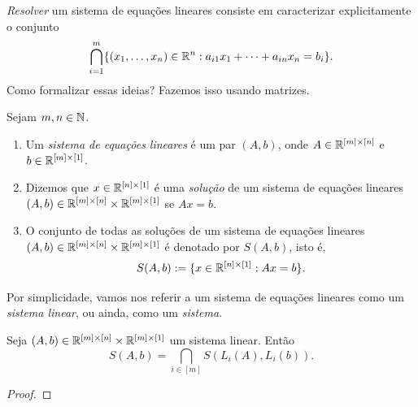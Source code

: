 \emph{Resolver} um sistema de equações lineares consiste em caracterizar explicitamente o conjunto
    \[
        \bigcap_{i=1}^{m} \{ (x_1, \ldots, x_n) \in \mathbb{R}^n : a_{i1} x_1 + \cdots + a_{in} x_n = b_i \}.
    \]
Como formalizar essas ideias? Fazemos isso usando matrizes.

\begin{definition}
    Sejam $m,n \in \mathbb{N}$.
        \begin{enumerate}[leftmargin=*, align=left, label=\textbf{(\alph*)}]
            \item Um \emph{sistema de equações lineares} é um par $(A,b)$, onde $A \in \mathbb{R}^{[m] \times [n]}$ e $b \in \mathbb{R}^{[m] \times [1]}$.
            \item Dizemos que $x \in \mathbb{R}^{[n] \times [1]}$ é uma \emph{solução} de um sistema de equações lineares $(A,b) \in \mathbb{R}^{[m] \times [n]} \times \mathbb{R}^{[m] \times [1]}$ se $Ax=b$.
            \item O conjunto de todas as soluções de um sistema de equações lineares $(A,b) \in \mathbb{R}^{[m] \times [n]} \times \mathbb{R}^{[m] \times [1]}$ é denotado por $S(A,b)$, isto é,
                \[
                    S(A,b) := \{x \in \mathbb{R}^{[n] \times [1]} : Ax=b\}.
                \]
        \end{enumerate}
\end{definition}

Por simplicidade, vamos nos referir a um sistema de equações lineares como um \emph{sistema linear}, ou ainda, como um \emph{sistema}.

\begin{proposition}
    Seja $(A,b) \in \mathbb{R}^{[m] \times [n]} \times \mathbb{R}^{[m] \times [1]}$ um sistema linear. Então
        \[
            S(A,b) = \bigcap_{i \in [m]} S(L_i(A),L_i(b)).
        \]
\end{proposition}

\begin{proof}
    \blackproof
\end{proof}

